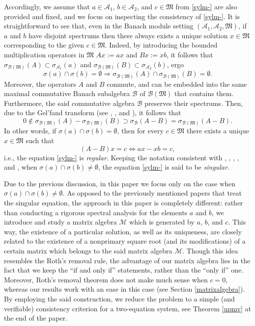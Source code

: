 \documentclass{article}
\theoremstyle{definition}
\def\A{{\mathcal{A}}}
\def\B{{\mathcal{B}}}
\def\M{\mathfrak{M}}
\begin{document}
Accordingly, we assume that $a\in\A_1$, $b\in\A_2$, and $c\in\M$ from \eqref{sylm-} are also provided and fixed, and we focus on inspecting the consistency of \eqref{sylm-}. It is straightforward to see that, even in the Banach module setting $(\A_1,\A_2,\M)$, if $a$ and $b$ have disjoint spectrums then there always exists a unique solution $x\in\M$ corresponding to the given $c\in\M$. Indeed, by introducing the bounded multiplication operators in $\M$ $Ax:=ax$ and $Bx:=xb$, it follows that $\sigma_{\B(\M)}(A)\subset\sigma_{\A_1}(a)$ and  $\sigma_{\B(\M)}(B)\subset\sigma_{\A_2}(b)$, ergo $$\sigma(a)\cap\sigma(b)=\emptyset\Rightarrow \sigma_{\B(\M)}(A)\cap\sigma_{\B(\M)}(B)=\emptyset.$$
Moreover, the operators $A$ and $B$ commute, and can be embedded into the same maximal commutative Banach subalgebra $\B$ of $\B(\M)$ that contains them. Furthermore, the said commutative algebra $\B$ preserves their spectrums. Then, due to the Gel'fand transform (see \cite{RBPR}, \cite{VM}, and \cite{AS}), it follows that
$$0\notin\sigma_{\B(\M)}(A)-\sigma_{\B(\M)}(B)\supset\sigma_{\B}(A-B)=\sigma_{\B(\M)}(A-B).$$
In other words, if $\sigma(a)\cap\sigma(b)=\emptyset$, then for every $c\in\M$ there exists a unique $x\in\M$ such that
$$(A-B)x=c\Leftrightarrow ax-xb=c,$$
i.e., the equation \eqref{sylm-} is \emph{regular}. Keeping the notation consistent with \cite{ECLHDS}, \cite{BD1}, \cite{BDD2}, \cite{BDND1},  and \cite{ASMD}, when $\sigma(a)\cap\sigma(b)\neq\emptyset$, the equation \eqref{sylm-} is said to be \emph{singular}. 


Due to the previous discussion, in this paper we focus only on the case when $\sigma(a)\cap\sigma(b)\neq\emptyset$. As opposed to the previously mentioned papers that treat the singular equation, the approach in this paper is completely different: rather than conducting a rigorous spectral analysis for the elements $a$ and $b$, we introduce and study a matrix algebra $\mathcal{M}$ which is generated by $a$, $b$, and $c$. This way, the existence of a particular solution, as well as its uniqueness, are closely related to the existence of a nonprimary square root (and its modifications) of a certain matrix which belongs to the said matrix algebra  $\mathcal{M}.$ Though this idea resembles the Roth's removal rule, the advantage of our matrix algebra lies in the fact that we keep the ``if and only if'' statements, rather than the ``only if'' one. Moreover, Roth's removal theorem does not make much sense when $c=0$, whereas  our results work with an ease in this case (see Section \ref{matrixalgebra}).  By employing the said construction, we reduce the problem to a simple  (and verifiable) consistency criterion for a two-equation system, see Theorem \ref{upmv} at the end of the paper. \\
\end{document}

